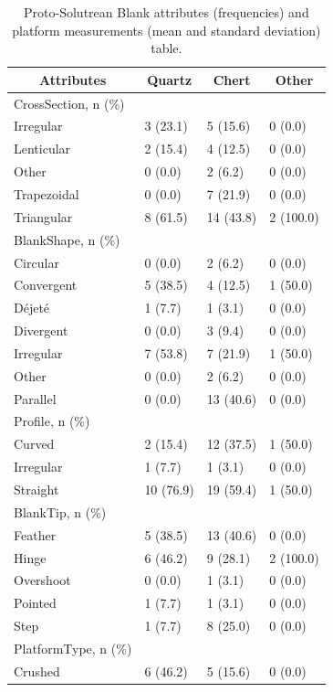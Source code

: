 \documentclass[12pt,twoside]{reedthesis}
\begin{document}
\begin{longtable}[t]{llll}
\caption{\label{tab:unnamed-chunk-75}Proto-Solutrean Blank attributes (frequencies) and platform measurements (mean and standard deviation) table.}\\
\toprule
\multicolumn{1}{c}{\textbf{Attributes}} & \multicolumn{1}{c}{\textbf{Quartz}} & \multicolumn{1}{c}{\textbf{Chert}} & \multicolumn{1}{c}{\textbf{Other}}\\
\midrule
CrossSection, n (\%) &  &  & \\
Irregular & 3 (23.1) & 5 (15.6) & 0 (0.0)\\
Lenticular & 2 (15.4) & 4 (12.5) & 0 (0.0)\\
Other & 0 (0.0) & 2 (6.2) & 0 \vphantom{1} (0.0)\\
Trapezoidal & 0 (0.0) & 7 (21.9) & 0 (0.0)\\
\addlinespace
Triangular & 8 (61.5) & 14 (43.8) & 2 (100.0)\\
BlankShape, n (\%) &  &  & \\
Circular & 0 (0.0) & 2 (6.2) & 0 (0.0)\\
Convergent & 5 (38.5) & 4 (12.5) & 1 (50.0)\\
Déjeté & 1 (7.7) & 1 (3.1) & 0 (0.0)\\
\addlinespace
Divergent & 0 (0.0) & 3 (9.4) & 0 (0.0)\\
Irregular & 7 (53.8) & 7 (21.9) & 1 (50.0)\\
Other & 0 (0.0) & 2 (6.2) & 0 (0.0)\\
Parallel & 0 (0.0) & 13 (40.6) & 0 (0.0)\\
Profile, n (\%) &  &  & \\
\addlinespace
Curved & 2 (15.4) & 12 (37.5) & 1 (50.0)\\
Irregular & 1 (7.7) & 1 (3.1) & 0 (0.0)\\
Straight & 10 (76.9) & 19 (59.4) & 1 (50.0)\\
BlankTip, n (\%) &  &  & \\
Feather & 5 (38.5) & 13 (40.6) & 0 (0.0)\\
\addlinespace
Hinge & 6 (46.2) & 9 (28.1) & 2 (100.0)\\
Overshoot & 0 (0.0) & 1 (3.1) & 0 (0.0)\\
Pointed & 1 (7.7) & 1 (3.1) & 0 (0.0)\\
Step & 1 (7.7) & 8 (25.0) & 0 (0.0)\\
PlatformType, n (\%) &  &  & \\
\addlinespace
Crushed & 6 (46.2) & 5 (15.6) & 0 (0.0)\\

\end{longtable}
\end{document}
